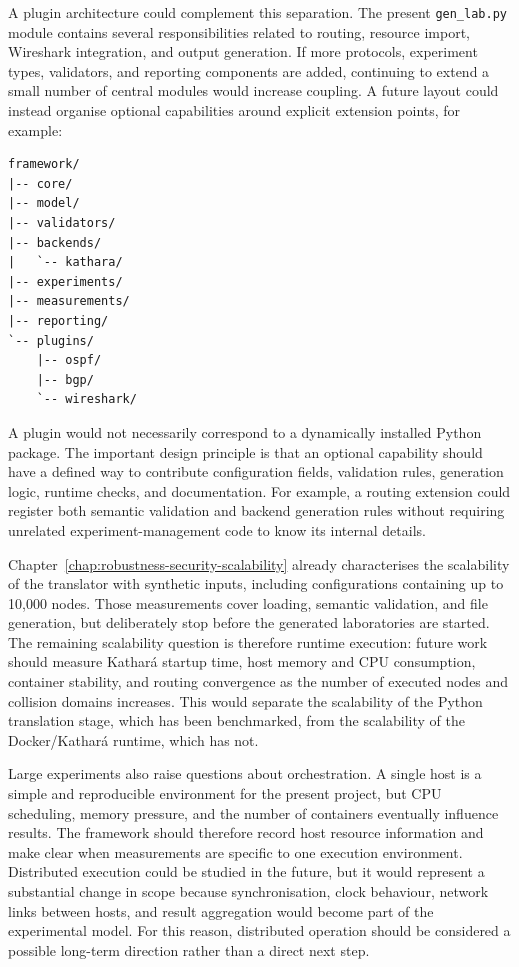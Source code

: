 A plugin architecture could complement this separation. The present
\texttt{gen\_lab.py} module contains several responsibilities related to
routing, resource import, Wireshark integration, and output generation. If more
protocols, experiment types, validators, and reporting components are added,
continuing to extend a small number of central modules would increase coupling.
A future layout could instead organise optional capabilities around explicit
extension points, for example:

\begin{lstlisting}[caption={Conceptual modular organisation for a larger framework.},label={lst:future-plugin-layout}]
framework/
|-- core/
|-- model/
|-- validators/
|-- backends/
|   `-- kathara/
|-- experiments/
|-- measurements/
|-- reporting/
`-- plugins/
    |-- ospf/
    |-- bgp/
    `-- wireshark/
\end{lstlisting}

A plugin would not necessarily correspond to a dynamically installed Python
package. The important design principle is that an optional capability should
have a defined way to contribute configuration fields, validation rules,
generation logic, runtime checks, and documentation. For example, a routing
extension could register both semantic validation and backend generation rules
without requiring unrelated experiment-management code to know its internal
details.

Chapter~\ref{chap:robustness-security-scalability} already characterises the
scalability of the translator with synthetic inputs, including configurations
containing up to 10,000 nodes. Those measurements cover loading, semantic
validation, and file generation, but deliberately stop before the generated
laboratories are started. The remaining scalability question is therefore
runtime execution: future work should measure Kathar\'a startup time, host
memory and CPU consumption, container stability, and routing convergence as the
number of executed nodes and collision domains increases. This would separate
the scalability of the Python translation stage, which has been benchmarked,
from the scalability of the Docker/Kathar\'a runtime, which has not.

Large experiments also raise questions about orchestration. A single host is a
simple and reproducible environment for the present project, but CPU scheduling,
memory pressure, and the number of containers eventually influence results.
The framework should therefore record host resource information and make clear
when measurements are specific to one execution environment. Distributed
execution could be studied in the future, but it would represent a substantial
change in scope because synchronisation, clock behaviour, network links between
hosts, and result aggregation would become part of the experimental model.
For this reason, distributed operation should be considered a possible
long-term direction rather than a direct next step.


